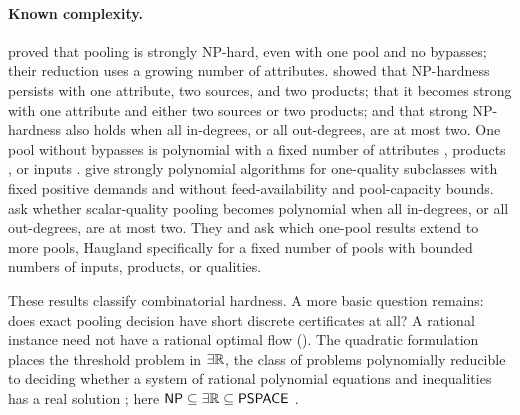 \paragraph{Known complexity.}
\citet{alfaki2013-strong-formulations-for-the-pooling} proved that
pooling is strongly NP-hard, even with one pool and no bypasses; their
reduction uses a growing number of attributes.
\citet{haugland2016-the-computational-complexity-of-the} showed that
NP-hardness persists with one attribute, two sources, and two products;
that it becomes strong with one attribute and either two sources or two
products; and that strong NP-hardness also holds when all in-degrees,
or all out-degrees, are at most two. One pool without bypasses is
polynomial with a fixed number of attributes
\citep[Proposition~2]{alfaki2013-strong-formulations-for-the-pooling},
products \citep[Theorem~2]{haugland2016-the-computational-complexity-of-the},
or inputs \citep{s3:haugland-hendrix2016,s4:boland2017}. \citet{s3:baltean2018}
give strongly polynomial algorithms for one-quality subclasses with
fixed positive demands and without feed-availability and pool-capacity
bounds. \citet[author manuscript, Section~4]{s4:boland2017} ask whether
scalar-quality pooling becomes polynomial when all in-degrees, or all
out-degrees, are at most two. They and
\citet[Section~6]{haugland2016-the-computational-complexity-of-the} ask
which one-pool results extend to more pools, Haugland specifically for a
fixed number of pools with bounded numbers of inputs, products, or
qualities.

These results classify combinatorial hardness. A more basic question
remains: does exact pooling decision have short discrete certificates at
all? A rational instance need not have a rational optimal flow
(). The quadratic formulation places the
threshold problem in $\exists\mathbb R$, the class of problems polynomially
reducible to deciding whether a system of rational polynomial equations
and inequalities has a real solution
\citep{schaefer2024-the-existential-theory-of-the}; here
$\mathsf{NP}\subseteq\exists\mathbb R\subseteq\mathsf{PSPACE}$
\citep[Section~1.1]{abrahamsen2019-dynamic-toolbox-for-etrinv}.

